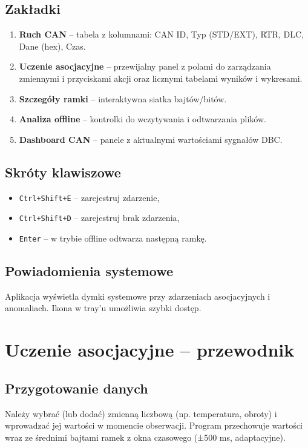 \documentclass[a4paper,12pt,polish]{article}
\begin{document}
\subsection{Zakładki}
\begin{enumerate}[noitemsep]
  \item \textbf{Ruch CAN} – tabela z kolumnami: CAN ID, Typ (STD/EXT), RTR, DLC, Dane (hex), Czas.
  \item \textbf{Uczenie asocjacyjne} – przewijalny panel z polami do zarządzania zmiennymi i przyciskami akcji oraz licznymi tabelami wyników i wykresami.
  \item \textbf{Szczegóły ramki} – interaktywna siatka bajtów/bitów.
  \item \textbf{Analiza offline} – kontrolki do wczytywania i odtwarzania plików.
  \item \textbf{Dashboard CAN} – panele z aktualnymi wartościami sygnałów DBC.
\end{enumerate}

\subsection{Skróty klawiszowe}
\begin{itemize}[noitemsep]
  \item \texttt{Ctrl+Shift+E} -- zarejestruj zdarzenie,
  \item \texttt{Ctrl+Shift+D} -- zarejestruj brak zdarzenia,
  \item \texttt{Enter} – w trybie offline odtwarza następną ramkę.
\end{itemize}

\subsection{Powiadomienia systemowe}
Aplikacja wyświetla dymki systemowe przy zdarzeniach asocjacyjnych i anomaliach. Ikona w tray'u umożliwia szybki dostęp.

\section{Uczenie asocjacyjne – przewodnik}
\label{sec:learning}

\subsection{Przygotowanie danych}
Należy wybrać (lub dodać) zmienną liczbową (np. temperatura, obroty) i wprowadzać jej wartości w momencie obserwacji. Program przechowuje wartości wraz ze średnimi bajtami ramek z okna czasowego (±500 ms, adaptacyjne).
\end{document}
